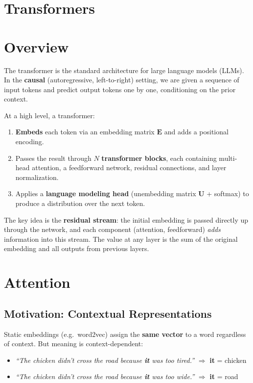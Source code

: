 \documentclass[main.tex]{subfiles}
\begin{document}
\section*{\Huge\textcolor{mantis}{Transformers}}
\vspace{0.5cm}

\section{Overview}

The transformer is the standard architecture for large language models (LLMs). In the \textbf{causal} (autoregressive, left-to-right) setting, we are given a sequence of input tokens and predict output tokens one by one, conditioning on the prior context.

At a high level, a transformer:
\begin{enumerate}
    \item \textbf{Embeds} each token via an embedding matrix $\mathbf{E}$ and adds a positional encoding.
    \item Passes the result through $N$ \textbf{transformer blocks}, each containing multi-head attention, a feedforward network, residual connections, and layer normalization.
    \item Applies a \textbf{language modeling head} (unembedding matrix $\mathbf{U}$ + softmax) to produce a distribution over the next token.
\end{enumerate}

The key idea is the \textbf{residual stream}: the initial embedding is passed directly up through the network, and each component (attention, feedforward) \emph{adds} information into this stream. The value at any layer is the sum of the original embedding and all outputs from previous layers.

\section{Attention}

\subsection{Motivation: Contextual Representations}

Static embeddings (e.g.\ word2vec) assign the \textbf{same vector} to a word regardless of context. But meaning is context-dependent:

\begin{itemize}
    \item \emph{``The chicken didn't cross the road because \textbf{it} was too tired.''} $\Rightarrow$ \textbf{it} = chicken
    \item \emph{``The chicken didn't cross the road because \textbf{it} was too wide.''} $\Rightarrow$ \textbf{it} = road
\end{itemize}
\end{document}
